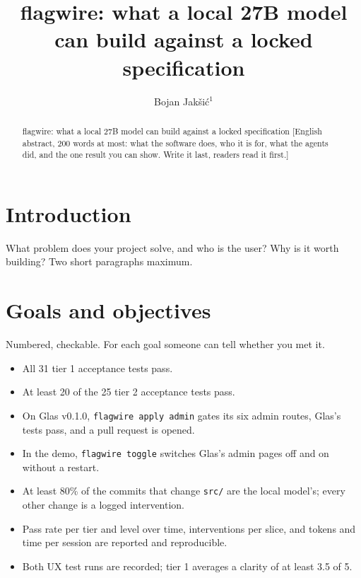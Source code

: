 \documentclass[a4paper]{article}
\begin{document}
\title{flagwire: what a local 27B model can build against a locked specification}

\author{Bojan Jak\v{s}i\'{c}$^{1}$}



\maketitle

\begin{abstract}{flagwire: what a local 27B model can build against a locked specification}
[English abstract, 200 words at most: what the software does, who it is for,
what the agents did, and the one result you can show. Write it last, readers
read it first.]
\end{abstract}

\section{Introduction}
What problem does your project solve, and who is the user? Why is it worth
building? Two short paragraphs maximum.

\section{Goals and objectives}
Numbered, checkable. For each goal someone can tell whether you met it.
\begin{itemize}
\item[G1.] All 31 tier 1 acceptance tests pass.
\item[G2.] At least 20 of the 25 tier 2 acceptance tests pass.
\item[G3.] On Glas v0.1.0, \texttt{flagwire apply admin} gates its six admin routes, Glas's tests pass, and a pull request is opened.
\item[G4.] In the demo, \texttt{flagwire toggle} switches Glas's admin pages off and on without a restart.
\item[G5.] At least 80\% of the commits that change \texttt{src/} are the local model's; every other change is a logged intervention.
\item[G6.] Pass rate per tier and level over time, interventions per slice, and tokens and time per session are reported and reproducible.
\item[G7.] Both UX test runs are recorded; tier 1 averages a clarity of at least 3.5 of 5.
\end{itemize}
\end{document}
